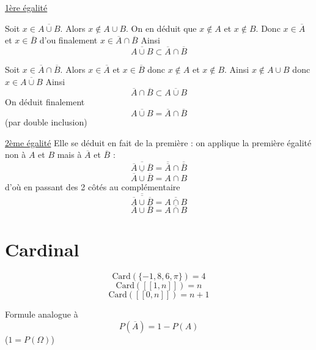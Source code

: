 \begin{preuve}
\underline{1ère égalité}\newline

Soit $x \in \overline{A\cup B}$. Alors $x \notin A\cup B$. On en déduit que $x\notin A$ et $x\notin B$. Donc $x\in \overline{A}$ et $x\in \overline{B}$ d'ou finalement $x\in \overline{A}\cap \overline{B}$\newline
Ainsi 
$$\overline{A\cup B} \subset \overline{A}\cap \overline{B}$$

Soit $x\in \overline{A}\cap \overline{B}$. Alors $x\in \overline{A}$ et $x\in \overline{B}$ donc $x\notin A$ et $x \notin B$. Ainsi $x\notin A\cup B$ donc $x\in \overline{A \cup B}$\newline
Ainsi 
$$\overline{A}\cap \overline{B} \subset \overline{A\cup B}$$
On déduit finalement 
$$\overline{A\cup B} = \overline{A}\cap \overline{B}$$
(par double inclusion)\newline


\underline{2ème égalité}\newline
Elle se déduit en fait de la première : on applique la première égalité non à $A$ et $B$ mais à $\overline{A}$ et $\overline{B}$ : 
$$\overline{\overline{A}\cup \overline{B}} = \overline{\overline{A}}\cap \overline{\overline{B}}$$
$$\overline{\overline{A}\cup \overline{B}} = A\cap B$$
d'où en passant des 2 côtés au complémentaire
$$\overline{\overline{\overline{A}\cup \overline{B}}} = \overline{A\cap B}$$
$$\overline{A}\cup \overline{B} = \overline{A\cap B}$$
\end{preuve}
\section{Cardinal}
\newline
\begin{exemple}
$$\text{Card}(\{-1,8,6,\pi\}) = 4$$
$$\text{Card}([\![1,n]\!]) = n$$
$$\text{Card}([\![0,n]\!]) = n+1$$
\end{exemple}
\newline

\begin{remarque}
Formule analogue à 
$$P(\overline{A}) = 1 - P(A)$$
($1 = P(\Omega)$)
\end{remarque}

